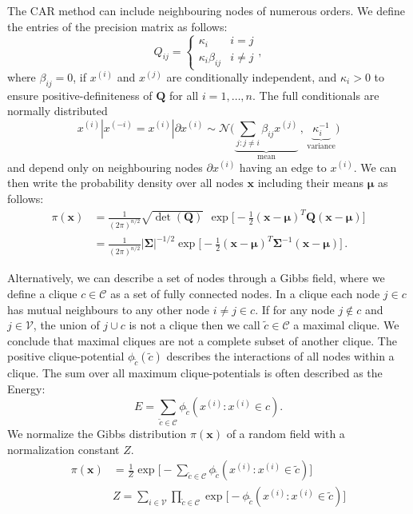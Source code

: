 The CAR method can include neighbouring nodes of numerous orders.
We define the entries of the precision matrix as follows:
\begin{equation}
      Q_{ij} = \begin{cases}
          \kappa_i & i = j \\
        \kappa_i \beta_{ij} & i \neq j
      \end{cases},
  \end{equation}
where $\beta_{ij} = 0 $, if $x^{(i)}$ and $x^{(j)}$ are conditionally independent, and $\kappa_i > 0$ to ensure positive-definiteness of $\bm{Q}$ for all $i = 1, \dots, n$.
The full conditionals are normally distributed
\begin{equation}
    x^{(i)} | x^{(-i)} = x^{(i)} | \partial x^{(i )} \sim \mathcal{N} \big( \underbrace{\sum_{j:j\neq i} \beta_{ij} x^{(j)}}_{\text{mean}}  \, , \, \underbrace{\kappa_i^{-1}}_{\text{variance}} \big)
\end{equation}
and depend only on neighbouring nodes $\partial x^{(i )}$ having an edge to $x^{(i)}$.
We can then write the probability density over all nodes $\bm{x}$ including their means $\bm{\mu}$ as follows:
\begin{align}
    \pi( \bm{x} ) %
    &= \frac{1}{(2 \pi)^{n/2}} \sqrt{\det(\bm{Q})} \ \, \exp{\Bigg[ - \frac{1}{2} ( \bm{x} - \bm{\mu} )^T \bm{Q} (\bm{x} - \bm{\mu}) \Bigg]} \\ 
     &= \frac{1}{(2 \pi)^{n/2}} |\bm{\Sigma}|^{-1/2} \exp{\Bigg[ - \frac{1}{2} ( \bm{x} - \bm{\mu} )^T \bm{\Sigma}^{-1} ( \bm{x} - \bm{\mu} ) \Bigg]} \, .
\end{align}

Alternatively, we can describe a set of nodes through a Gibbs field, where we define a clique $c \in \mathcal{C}$ as a set of fully connected nodes.
In a clique each node $j \in c$ has mutual neighbours to any other node $i \neq j \in c$. 
If for any node $j \notin c$ and $j \in \mathcal{V}$, the union of $j \cup c$ is not a clique then we call $\tilde{c} \in \mathcal{C}$ a maximal clique.
We conclude that maximal cliques are not a complete subset of another clique.
The positive clique-potential $\phi_{\tilde{c}}(\tilde{c})$ describes the interactions of all nodes within a clique.
The sum over all maximum clique-potentials is often described as the Energy:
\begin{equation}
    E = \sum_{\tilde{c} \in \mathcal{C}} \phi_{\tilde{c}}(x^{(i)} : x^{(i)} \in c).
\end{equation}
We normalize the Gibbs distribution $\pi(\bm{x})$ of a random field with a normalization constant $Z$.
\begin{align}
    \pi(\bm{x}) &= \frac{1}{Z} \exp{ \Big[ -\sum_{\tilde{c}\in \mathcal{C}} \phi_{\tilde{c}}(x^{(i)} : x^{(i)} \in \tilde{c}) \Big] } \\
    &Z = \sum_{i \in \mathcal{V}} \prod_{\tilde{c} \in \mathcal{C}} \exp{ \Big[ - \phi_{\tilde{c}} (x^{(i)}: x^{(i)} \in \tilde{c}) \Big] } 
\end{align}


